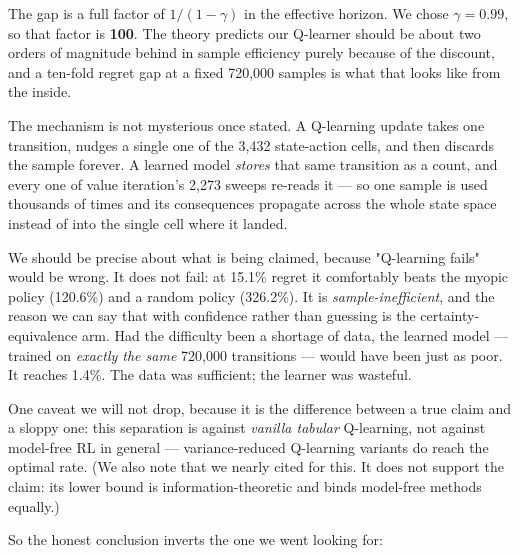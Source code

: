 \documentclass{ai-lab-report}
\begin{document}
The gap is a full factor of $1/(1-\gamma)$ in the effective horizon. We chose $\gamma = 0.99$, so
that factor is \textbf{100}. The theory predicts our Q-learner should be about two orders of
magnitude behind in sample efficiency purely because of the discount, and a ten-fold regret gap
at a fixed 720{,}000 samples is what that looks like from the inside.

The mechanism is not mysterious once stated. A Q-learning update takes one transition, nudges a
single one of the 3{,}432 state-action cells, and then discards the sample forever. A learned
model \emph{stores} that same transition as a count, and every one of value iteration's 2{,}273
sweeps re-reads it --- so one sample is used thousands of times and its consequences propagate
across the whole state space instead of into the single cell where it landed.

We should be precise about what is being claimed, because "Q-learning fails" would be
wrong. It does not fail: at 15.1\% regret it comfortably beats the myopic policy (120.6\%) and a
random policy (326.2\%). It is \emph{sample-inefficient}, and the reason we can say that with
confidence rather than guessing is the certainty-equivalence arm. Had the difficulty been a
shortage of data, the learned model --- trained on \emph{exactly the same} 720{,}000 transitions
--- would have been just as poor. It reaches 1.4\%. The data was sufficient; the learner was
wasteful.

One caveat we will not drop, because it is the difference between a true claim and a sloppy one:
this separation is against \emph{vanilla tabular} Q-learning, not against model-free RL in
general --- variance-reduced Q-learning variants do reach the optimal rate. (We also note that we
nearly cited \citet{azar2013minimax} for this. It does not support the claim: its lower bound is
information-theoretic and binds model-free methods equally.)

So the honest conclusion inverts the one we went looking for:
\end{document}
